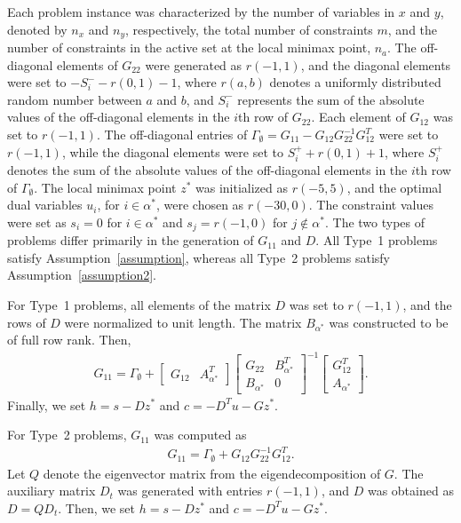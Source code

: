\documentclass{article}
\begin{document}
	Each problem instance was characterized by the number of variables in $x$ and $y$, denoted by $n_{x}$ and $n_{y}$, respectively, the total number of constraints $m$, and the number of constraints in the active set at the local minimax point, $n_{a}$. The off-diagonal elements of $G_{22}$ were generated as $r(-1,1)$, and the diagonal elements were set to $-S_{i}^{-} - r(0,1) - 1$, where $r(a,b)$ denotes a uniformly distributed random number between $a$ and $b$, and $S_{i}^{-}$ represents the sum of the absolute values of the off-diagonal elements in the $i$th row of $G_{22}$. Each element of $G_{12}$ was set to $r(-1,1)$. The off-diagonal entries of $\Gamma_{\emptyset} = G_{11} - G_{12}G_{22}^{-1}G_{12}^{T}$ were set to $r(-1,1)$, while the diagonal elements were set to $S_{i}^{+} + r(0,1) + 1$, where $S_{i}^{+}$ denotes the sum of the absolute values of the off-diagonal elements in the $i$th row of $\Gamma_{\emptyset}$. The local minimax point $z^{\ast}$ was initialized as $r(-5,5)$, and the optimal dual variables $u_{i}$, for $i \in \alpha^{\ast}$, were chosen as $r(-30,0)$. The constraint values were set as $s_{i} = 0$ for $i \in \alpha^{\ast}$ and $s_{j} = r(-1,0)$ for $j \notin \alpha^{\ast}$. The two types of problems differ primarily in the generation of $G_{11}$ and $D$. All Type~1 problems satisfy Assumption~\ref{assumption}, whereas all Type~2 problems satisfy Assumption~\ref{assumption2}.
	
	For Type~1 problems, all elements of the matrix $D$ was set to $r(-1,1)$, and the rows of $D$ were normalized to unit length. The matrix $B_{\alpha^{\ast}}$ was constructed to be of full row rank. Then,
	\begin{align*}
		G_{11} = \Gamma_{\emptyset} + 
		\begin{bmatrix}
			G_{12} & A_{\alpha^{\ast}}^{T}
		\end{bmatrix}
		\begin{bmatrix}
			G_{22} & B_{\alpha^{\ast}}^{T} \\
			B_{\alpha^{\ast}} & 0
		\end{bmatrix}^{-1}
		\begin{bmatrix}
			G_{12}^{T} \\ A_{\alpha^{\ast}}
		\end{bmatrix}.
	\end{align*}
	Finally, we set $h = s - Dz^{\ast}$ and $c = -D^{T}u - Gz^{\ast}$.
	
	For Type~2 problems, $G_{11}$ was computed as
	\begin{align*}
		G_{11} = \Gamma_{\emptyset} + G_{12}G_{22}^{-1}G_{12}^{T}.
	\end{align*}
	Let $Q$ denote the eigenvector matrix from the eigendecomposition of $G$. The auxiliary matrix $D_{t}$ was generated with entries $r(-1,1)$, and $D$ was obtained as $D = Q D_{t}$. Then, we set $h = s - Dz^{\ast}$ and $c = -D^{T}u - Gz^{\ast}$.
\end{document}
